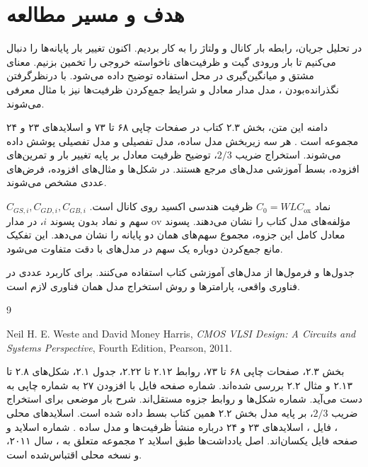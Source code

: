 \documentclass[12pt,a4paper]{article}
\newcommand{\secnum}[1]{\mbox{\beginL#1\endL}}
\begin{document}
\MakeAssignmentCover
\section*{هدف و مسیر مطالعه}
در تحلیل جریان، رابطه بار کانال و ولتاژ  را به کار بردیم.
اکنون تغییر بار پایانه‌ها را دنبال می‌کنیم تا بار ورودی گیت و ظرفیت‌های ناخواسته
خروجی را تخمین بزنیم. معنای مشتق و میانگین‌گیری در محل استفاده توضیح داده می‌شود.
با درنظرگرفتن نگذرانده‌بودن ، مدل مدار معادل و شرایط
جمع‌کردن ظرفیت‌ها نیز با مثال معرفی می‌شوند.

دامنه این متن، بخش \secnum{۲.۳} کتاب در صفحات چاپی ۶۸ تا ۷۳ و اسلایدهای ۲۳ و ۲۴
مجموعه  است \cite{weste,mos}. هر سه زیربخش مدل ساده، مدل تفصیلی
 و مدل تفصیلی  پوشش داده می‌شوند.
استخراج ضریب \(2/3\)، توضیح ظرفیت معادل بر پایه تغییر بار و تمرین‌های افزوده،
بسط آموزشی مدل‌های مرجع هستند. در شکل‌ها و مثال‌های افزوده، فرض‌های عددی مشخص می‌شوند.

نماد \(C_0=WLC_{\mathrm{ox}}\) ظرفیت هندسی اکسید روی کانال است.
\(C_{GS,i},C_{GD,i},C_{GB,i}\) مؤلفه‌های  مدل کتاب را نشان می‌دهند.
پسوند \(\mathrm{ov}\) سهم  و نماد بدون پسوند \(i\)، در مدار معادل
کامل این جزوه، مجموع سهم‌های همان دو پایانه را نشان می‌دهد.
این تفکیک مانع جمع‌کردن دوباره یک سهم در مدل‌های با دقت متفاوت می‌شود.

جدول‌ها و فرمول‌ها از مدل‌های آموزشی کتاب استفاده می‌کنند. برای کاربرد عددی در
فناوری واقعی، پارامترها و روش استخراج مدل همان فناوری لازم است.
\tableofcontents
\clearpage



\begin{thebibliography}{9}
\begin{latin}
Neil H. E. Weste and David Money Harris,
\textit{CMOS VLSI Design: A Circuits and Systems Perspective},
Fourth Edition, Pearson, 2011.
\end{latin}
بخش \secnum{۲.۳}، صفحات چاپی ۶۸ تا ۷۳، روابط \secnum{۲.۱۲} تا
\secnum{۲.۲۲}، جدول \secnum{۲.۱}، شکل‌های \secnum{۲.۸} تا \secnum{۲.۱۳}
و مثال \secnum{۲.۲} بررسی شده‌اند. شماره صفحه فایل  با افزودن ۲۷ به
شماره چاپی به دست می‌آید. شماره شکل‌ها و روابط جزوه مستقل‌اند.
شرح بار موضعی برای استخراج ضریب \(2/3\)، بر پایه مدل 
بخش \secnum{۲.۲} همین کتاب بسط داده شده است.
اسلایدهای محلی ، فایل ،
اسلایدهای ۲۳ و ۲۴ درباره منشأ ظرفیت‌ها و مدل ساده .
شماره اسلاید و صفحه فایل یکسان‌اند. اصل یادداشت‌ها طبق اسلاید ۲ مجموعه
 متعلق به ، سال ۲۰۱۱، و نسخه
محلی اقتباس‌شده است.
\end{thebibliography}
\end{document}
